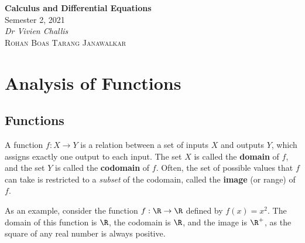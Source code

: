 \documentclass{article}
\date{}
\newcommand{\unitName}{Calculus and Differential Equations}
\newcommand{\unitTime}{Semester 2, 2021}
\newcommand{\unitCoordinator}{Dr Vivien Challis}
\newcommand{\documentAuthors}{\textsc{Rohan Boas} \quad\quad \textsc{Tarang Janawalkar}}
\begin{document}
%
\begin{titlepage}
    \vspace*{\fill}
    \begin{center}
        \LARGE{\textbf{\unitName}} \\[0.1in]
        \normalsize{\unitTime} \\[0.2in]
        \normalsize\textit{\unitCoordinator} \\[0.2in]
        \documentAuthors
    \end{center}
    \vspace*{\fill}
    \doclicenseThis
    \thispagestyle{empty}
\end{titlepage}
%
\tableofcontents
\newpage
%
\section{Analysis of Functions}
\subsection{Functions}
\begin{definition}[Function]
    A function \(f: X \to Y\) is a relation between a set of inputs
    \(X\) and outputs \(Y\), which assigns exactly one output to each
    input. The set \(X\) is called the \textbf{domain} of \(f\), and the
    set \(Y\) is called the \textbf{codomain} of \(f\). Often, the set
    of possible values that \(f\) can take is restricted to a
    \textit{subset} of the codomain, called the \textbf{image}
    (or range) of \(f\).
\end{definition}
As an example, consider the function \(f: \R \to \R\) defined by
\(f\left( x \right) = x^2\). The domain of this function is \(\R\),
the codomain is \(\R\), and the image is \(\R^+\), as the square of any
real number is always positive.
\end{document}
